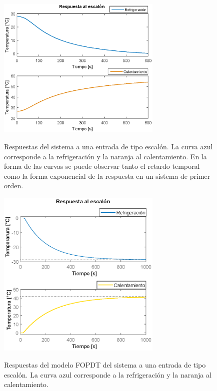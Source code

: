 \begin{figure}[h!]
\begin{centering}
    \caption{Respuestas del sistema a una entrada de tipo escalón. La curva azul corresponde a la  refrigeración y la naranja al calentamiento. En la forma de las curvas se puede observar tanto el retardo temporal como la forma exponencial de la respuesta en un sistema de primer orden.}
  \includegraphics[width=0.7\textwidth]{Images/plant_response.eps}
    \label{fig:step_response}
  \par\end{centering}
\end{figure}
\begin{figure}[h!]
\begin{centering}
    \caption{Respuestas del modelo FOPDT del sistema a una entrada de tipo escalón. La curva azul corresponde a la  refrigeración y la naranja al calentamiento.}
  \includegraphics[width=0.7\textwidth]{Images/step}
    \label{fig:step_model_plant}
  \par\end{centering}
\end{figure}
